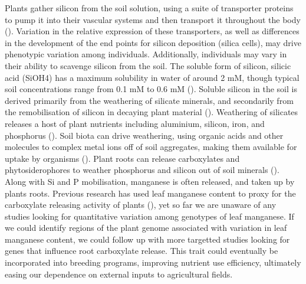 \documentclass[12pt, letterpaper, ]{report}
\begin{document}
Plants gather silicon from the soil solution, using a suite of transporter proteins to pump it into their vascular systems and then transport it throughout the body (\cite{reynolds_silicon_2016}).  Variation in the relative expression of these transporters, as well as differences in the development of the end points for silicon deposition (silica cells), may drive phenotypic variation among individuals. Additionally, individuals may vary in their ability to scavenge silicon from the soil. The soluble form of silicon, silicic acid (SiOH4) has a maximum solubility in water of around 2 mM, though typical soil concentrations range from 0.1 mM to 0.6 mM (\cite{epstein_anomaly_1994}). Soluble silicon in the soil is derived primarily from the weathering of silicate minerals, and secondarily from the remobilisation of silicon in decaying plant material (\cite{de_tombeur_silicon_2021-1}). Weathering of silicates releases a host of plant nutrients including aluminium, silicon, iron, and phosphorus (\cite{de_tombeur_silicon_2021-1}). Soil biota can drive weathering, using organic acids and other molecules to complex metal ions off of soil aggregates, making them available for uptake by organisms (\cite{de_tombeur_silicon_2021}). Plant roots can release carboxylates and phytosiderophores to weather phosphorus and silicon out of soil minerals (\cite{de_tombeur_silicon_2021-1}). Along with Si and P mobilisation, manganese is often released, and taken up by plants roots. Previous research has used leaf manganese content to proxy for the carboxylate releasing activity of plants (\cite{lambers_leaf_2015}), yet so far we are unaware of any studies looking for quantitative variation among genotypes of leaf manganese. If we could identify regions of the plant genome associated with variation in leaf manganese content, we could follow up with more targetted studies looking for genes that influence root carboxylate release. This trait could eventually be incorporated into breeding programs, improving nutrient use efficiency, ultimately easing our dependence on external inputs to agricultural fields. 
\end{document}
